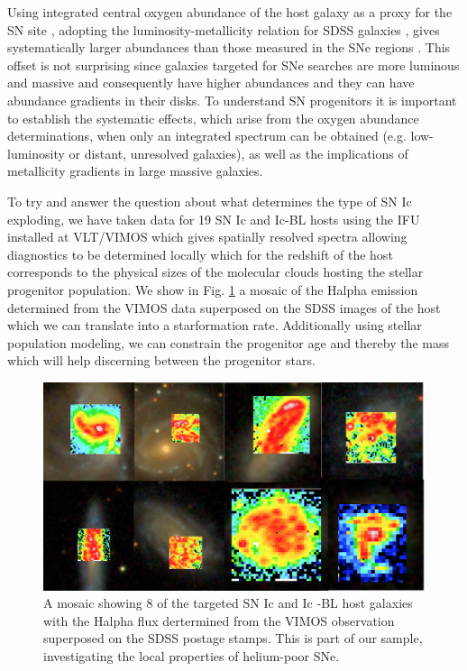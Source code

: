 Using integrated central oxygen abundance of the host
galaxy as a proxy for the SN site \citep{Prieto2008, Kelly2012}, adopting the
luminosity-metallicity relation for SDSS galaxies \citep{Tremonti2004}, gives
systematically larger abundances than those measured in the SNe regions \citep{Modjaz2011}.
This offset is not surprising since galaxies targeted for SNe searches
are more luminous and massive and consequently have higher abundances
and they can have abundance gradients in their disks.
To understand SN progenitors it is important to establish the
systematic effects, which arise from the oxygen abundance
determinations, when only an integrated spectrum can be obtained
(e.g. low-luminosity or distant, unresolved galaxies), as well as the
implications of metallicity gradients in large massive galaxies.

To try and answer the question about what determines the type of SN Ic
exploding, we have taken data for 19 SN Ic and Ic-BL hosts using the IFU
installed at VLT/VIMOS which gives spatially resolved spectra allowing diagnostics
to be determined locally which for the redshift of the host corresponds to the
physical sizes of the molecular clouds hosting the stellar progenitor
population. We show in Fig. \ref{fig:intro:snifu} a mosaic of the Halpha
emission determined from the VIMOS data superposed on the SDSS images of the
host which we can translate into a starformation rate. Additionally using
stellar population modeling, we can constrain the progenitor age and thereby the
mass which will help discerning between the progenitor stars. 



\begin{figure}[htb]
	\includegraphics[width=\textwidth]{gfx/ifu}
	\caption{A mosaic showing 8 of the targeted SN Ic and Ic -BL host galaxies with the Halpha flux dertermined from the VIMOS observation superposed on the SDSS postage stamps. This is part of our sample, investigating the local properties of helium-poor SNe. }
	\label{fig:intro:snifu}
\end{figure}

